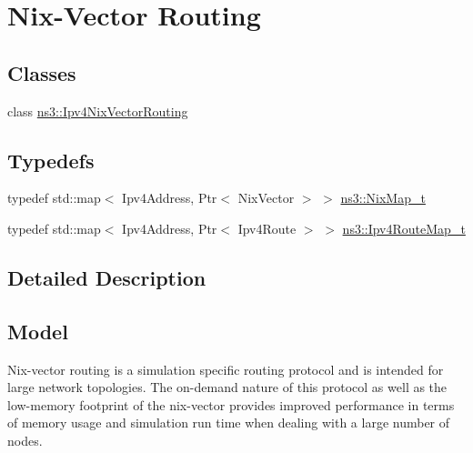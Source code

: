 \hypertarget{group__nix-vector-routing}{}\section{Nix-\/\+Vector Routing}
\label{group__nix-vector-routing}
\subsection*{Classes}
\begin{DoxyCompactItemize}
\item 
class \hyperlink{classns3_1_1Ipv4NixVectorRouting}{ns3\+::\+Ipv4\+Nix\+Vector\+Routing}
\end{DoxyCompactItemize}
\subsection*{Typedefs}
\begin{DoxyCompactItemize}
\item 
typedef std\+::map$<$ Ipv4\+Address, Ptr$<$ Nix\+Vector $>$ $>$ \hyperlink{group__nix-vector-routing_gaa552b6157fc91cb632b9007a4cef9bc7}{ns3\+::\+Nix\+Map\+\_\+t}
\item 
typedef std\+::map$<$ Ipv4\+Address, Ptr$<$ Ipv4\+Route $>$ $>$ \hyperlink{group__nix-vector-routing_ga0a2084e70cce2de3dcfab5da0ec63bdd}{ns3\+::\+Ipv4\+Route\+Map\+\_\+t}
\end{DoxyCompactItemize}


\subsection{Detailed Description}
\hypertarget{group__nix-vector-routing_model}{}\subsection{Model}\label{group__nix-vector-routing_model}
Nix-\/vector routing is a simulation specific routing protocol and is intended for large network topologies. The on-\/demand nature of this protocol as well as the low-\/memory footprint of the nix-\/vector provides improved performance in terms of memory usage and simulation run time when dealing with a large number of nodes.

